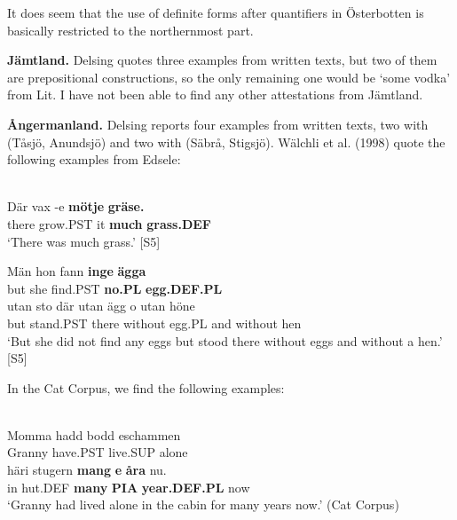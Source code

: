 \z

It does seem that the use of definite forms after quantifiers in Österbotten is basically restricted to the northernmost part.


\textbf{Jämtland. }Delsing quotes three examples from written texts, but two of them are prepositional constructions, so the only remaining one would be  ‘some vodka’ from Lit. I have not been able to find any other attestations from Jämtland.


\textbf{Ångermanland.} Delsing reports four examples from written texts, two with  (Tåsjö, Anundsjö) and two with (Säbrå, Stigsjö). Wälchli et al. (1998) quote the following examples from Edsele:


\ea\label{}
\\
\gll Där  vax  {}-e  \textbf{mötje} \textbf{  gräse.}\\
there  grow.PST  it  \textbf{much} \textbf{grass.DEF}\\
\glt ‘There was much grass.’ [S5]

\z

\ea
\gll Män  hon  fann  \textbf{inge} \textbf{ägga}\\
but  she  find.PST  \textbf{no.PL} \textbf{egg.DEF.PL}\\
\gll utan  sto  där  utan  ägg  o  utan  höne\\
but  stand.PST  there  without  egg.PL  and  without  hen\\
\glt ‘But she did not find any eggs but stood there without eggs and without a hen.’ [S5]

\z

In the Cat Corpus, we find the following examples:


\ea\label{}
\\
\gll Momma  hadd  bodd  eschammen\\
Granny  have.PST  live.SUP  alone\\
\gll häri  stugern  \textbf{mang} \textbf{  e} \textbf{  åra} nu.\\
in  hut.DEF  \textbf{many} \textbf{PIA} \textbf{year.DEF.PL} now\\
\glt ‘Granny had lived alone in the cabin for many years now.’ (Cat Corpus)

